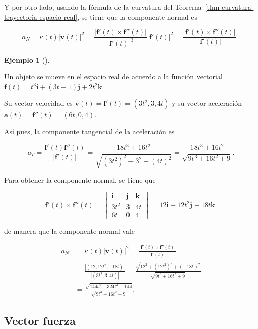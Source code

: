 \documentclass[
  a4paper,
]{scrreport}
\theoremstyle{definition}
\newtheorem{example}{Ejemplo}[chapter]
\theoremstyle{plain}
\theoremstyle{plain}
\theoremstyle{definition}
\theoremstyle{plain}
\theoremstyle{remark}
\begin{document}
Y por otro lado, usando la fórmula de la curvatura del
Teorema~\ref{thm-curvatura-trayectoria-espacio-real}, se tiene que la
componente normal es

\[
a_N 
= \kappa(t)|\mathbf{v}(t)|^2 
= \frac{|\mathbf{f}'(t)\times \mathbf{f}''(t)|}{|\mathbf{f}'(t)|^3}|\mathbf{f}'(t)|^2
= \frac{|\mathbf{f}'(t)\times \mathbf{f}''(t)|}{|\mathbf{f}'(t)|}|.
\]

\begin{example}[]\protect\hypertarget{exm-componente-tangencial-normal-trayectoria}{}\label{exm-componente-tangencial-normal-trayectoria}

Un objeto se mueve en el espacio real de acuerdo a la función vectorial
\(\mathbf{f}(t) = t^3\mathbf{i} + (3t-1)\mathbf{j} + 2t^2 \mathbf{k}\).

Su vector velocidad es \(\mathbf{v}(t)=\mathbf{f}'(t) = (3t^2, 3, 4t)\)
y su vector aceleración \(\mathbf{a}(t) = \mathbf{f}''(t)=(6t, 0, 4)\).

Así pues, la componente tangencial de la aceleración es

\[
a_T
= \frac{\mathbf{f}'(t)\mathbf{f}''(t)}{|\mathbf{f}'(t)|}
= \frac{18t^3+16t^2}{\sqrt{(3t^2)^2 + 3^2 + (4t)^2}}
= \frac{18t^3+16t^2}{\sqrt{9t^3+16t^2+9}}.
\]

Para obtener la componente normal, se tiene que

\[
\mathbf{f}'(t)\times \mathbf{f}''(t)
=
\begin{vmatrix}
\mathbf{i} & \mathbf{j} &\mathbf{k}\\
3t^2 & 3 & 4t \\
6t & 0 & 4
\end{vmatrix}
= 12\mathbf{i}+12t^2\mathbf{j}-18t\mathbf{k}.
\]

de manera que la componente normal vale

\begin{align*}
a_N 
&= \kappa(t)|\mathbf{v}(t)|^2 
= \frac{|\mathbf{f}'(t)\times \mathbf{f}''(t)|}{|\mathbf{f}'(t)|} \\
&= \frac{|(12, 12t^2, -18t)|}{|(3t^2,3,4t)|}
= \frac{\sqrt{12^2+(12t^2)^2+(-18t)^2}}{\sqrt{9t^3+16t^2+9}} \\
&= \frac{\sqrt{144t^4+324t^2+144}}{\sqrt{9t^3+16t^2+9}}.
\end{align*}

\end{example}

\hypertarget{vector-fuerza}{%
\subsection{Vector fuerza}\label{vector-fuerza}}
\end{document}
